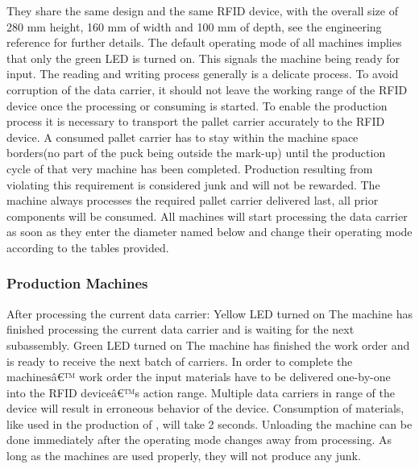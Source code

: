 \documentclass[12pt,twoside]{article}
\begin{document}
They share the same design and the same RFID device, with the overall
size of 280 mm height, 160 mm of width and 100 mm of depth, see the
engineering reference for further details. The default operating mode
of all machines implies that only the green LED is turned on. This
signals the machine being ready for input. The reading and writing
process generally is a delicate process. To avoid corruption of the
data carrier, it should not leave the working range of the RFID device
once the processing or consuming is started. To enable the production
process it is necessary to transport the pallet carrier accurately to
the RFID device. A consumed pallet carrier has to stay within the
machine space borders(no part of the puck being outside the mark-up)
until the production cycle of that very machine has been
completed. Production resulting from violating this requirement is
considered junk and will not be rewarded. The machine always processes
the required pallet carrier delivered last, all prior components will
be consumed. All machines will start processing the data carrier as
soon as they enter the diameter named below and change their operating
mode according to the tables provided.


\subsubsection{Production Machines}
After processing the current data carrier: Yellow LED turned on The
machine has finished processing the current data carrier and is
waiting for the next subassembly. Green LED turned on The machine has
finished the work order and is ready to receive the next batch of
carriers. In order to complete the machinesâ€™ work order the input
materials have to be delivered one-by-one into the RFID deviceâ€™s
action range. Multiple data carriers in range of the device will
result in erroneous behavior of the device. Consumption of materials,
like  used in the production of , will take 2 seconds. Unloading
the machine can be done immediately after the operating mode changes
away from processing. As long as the machines are used properly, they
will not produce any junk.
\end{document}
